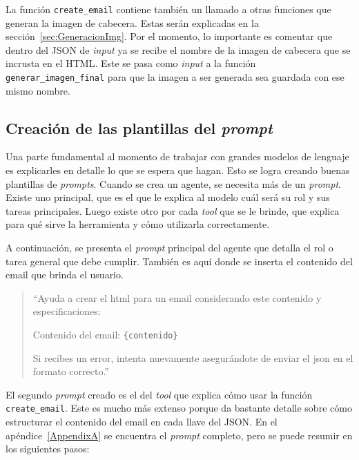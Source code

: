 La función \texttt{create\_email} contiene también un llamado a otras funciones que generan la imagen de cabecera. Estas serán explicadas en la sección~\ref{sec:GeneracionImg}. Por el momento, lo importante es comentar que dentro del JSON de \textit{input} ya se recibe el nombre de la imagen de cabecera que se incrusta en el HTML. Este se pasa como \textit{input} a la función \texttt{generar\_imagen\_final} para que la imagen a ser generada sea guardada con ese mismo nombre.


\subsection{Creación de las plantillas del \textit{prompt}}

Una parte fundamental al momento de trabajar con grandes modelos de lenguaje es explicarles en detalle lo que se espera que hagan. Esto se logra creando buenas plantillas de \textit{prompts}. Cuando se crea un agente, se necesita más de un \textit{prompt}. Existe uno principal, que es el que le explica al modelo cuál será su rol y sus tareas principales. Luego existe otro por cada \textit{tool} que se le brinde, que explica para qué sirve la herramienta y cómo utilizarla correctamente.

A continuación, se presenta el \textit{prompt} principal del agente que detalla el rol o tarea general que debe cumplir. También es aquí donde se inserta el contenido del email que brinda el usuario.

\begin{quote}
``Ayuda a crear el html para un email considerando este contenido y especificaciones:

Contenido del email: \texttt{\{contenido\}}

Si recibes un error, intenta nuevamente asegurándote de enviar el json en el formato correcto.''
\end{quote}

El segundo \textit{prompt} creado es el del \textit{tool} que explica cómo usar la función \\ \texttt{create\_email}. Este es mucho más extenso porque da bastante detalle sobre cómo estructurar el contenido del email en cada llave del JSON. En el apéndice~\ref{AppendixA} se encuentra el \textit{prompt} completo, pero se puede resumir en los siguientes pasos:


